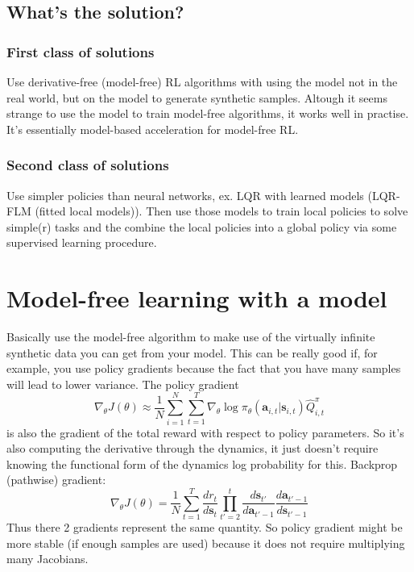 \documentclass{report}
\begin{document}
\subsection{What's the solution?}
\subsubsection{First class of solutions}
Use derivative-free (model-free) RL algorithms with using the model not in the real world, but on the model to generate synthetic samples.
Altough it seems strange to use the model to train model-free algorithms, it works well in practise.
It's essentially model-based acceleration for model-free RL.
\subsubsection{Second class of solutions}
Use simpler policies than neural networks, ex. LQR with learned models (LQR-FLM (fitted local models)).
Then use those models to train local policies to solve simple(r) tasks and the combine the local policies
into a global policy via some supervised learning procedure.

\section{Model-free learning with a model}
Basically use the model-free algorithm to make use of the virtually infinite synthetic data you can get from your model.
This can be really good if, for example, you use policy gradients because the fact that you have many samples will lead to lower variance. 
The policy gradient
\begin{equation}
		\nabla_{\theta} J(\theta) \approx
		\frac{1}{N} \sum_{i=1}^{N} \sum_{t=1}^{T} \nabla_{\theta} \log \pi_\theta (\bm{a}_{i,t}| \bm{s}_{i,t}) \hat{Q}^\pi_{i,t}
\end{equation}
is also the gradient of the total reward with respect to policy parameters.
So it's also computing the derivative through the dynamics, it just doesn't require knowing the functional form of
the dynamics log probability for this.
Backprop (pathwise) gradient:
\begin{equation}
		\nabla_{\theta} J(\theta) =
		\frac{1}{N} \sum_{t=1}^{T} \frac{dr_t}{d\bm{s}_{t}} \prod_{t'=2}^{t} \frac{d\bm{s}_{t'}}{d\bm{a}_{t'-1}} \frac{d\bm{a}_{t'-1}}{d\bm{s}_{t'-1}}  
\end{equation}
Thus there 2 gradients represent the same quantity.
So policy gradient might be more stable (if enough samples are used) because it does not require multiplying many Jacobians.
\end{document}
